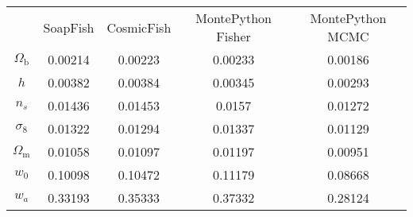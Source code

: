 \begin{table}
\centering
\begin{tabular}{|c|c|c|c|c|}
 & SoapFish & CosmicFish & MontePython Fisher & MontePython MCMC \\
$\Omega_\mathrm{b}$ & 0.00214 & 0.00223 & 0.00233 & 0.00186 \\
$h$ & 0.00382 & 0.00384 & 0.00345 & 0.00293 \\
$n_s$ & 0.01436 & 0.01453 & 0.0157 & 0.01272 \\
$\sigma_8$ & 0.01322 & 0.01294 & 0.01337 & 0.01129 \\
$\Omega_\mathrm{m}$ & 0.01058 & 0.01097 & 0.01197 & 0.00951 \\
$w_0$ & 0.10098 & 0.10472 & 0.11179 & 0.08668 \\
$w_a$ & 0.33193 & 0.35333 & 0.37332 & 0.28124 \\
\end{tabular}
\end{table}
